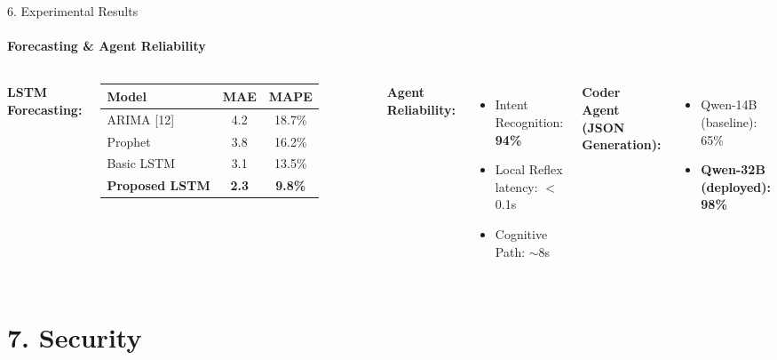 \documentclass[10pt]{beamer}
\begin{document}
\begin{frame}{6. Experimental Results}
    \framesubtitle{Forecasting \& Agent Reliability}
    \begin{columns}
        \textbf{LSTM Forecasting:}
        \begin{table}
            \centering
            \footnotesize
            \begin{tabular}{lcc}
                \toprule
                \textbf{Model} & \textbf{MAE} & \textbf{MAPE} \\
                \midrule
                ARIMA [12]    & 4.2 & 18.7\% \\
                Prophet       & 3.8 & 16.2\% \\
                Basic LSTM    & 3.1 & 13.5\% \\
                \textbf{Proposed LSTM} & \textbf{2.3} & \textbf{9.8\%} \\
                \bottomrule
            \end{tabular}
        \end{table}

        \textbf{Agent Reliability:}
        \begin{itemize}
            \item Intent Recognition: \textbf{94\%}
            \item Local Reflex latency: $<$0.1s
            \item Cognitive Path: $\sim$8s
        \end{itemize}
        \vspace{0.3cm}
        \textbf{Coder Agent (JSON Generation):}
        \begin{itemize}
            \item Qwen-14B (baseline): 65\%
            \item \textbf{Qwen-32B (deployed): 98\%}
        \end{itemize}
    \end{columns}
\end{frame}

\section{7. Security}
\end{document}
